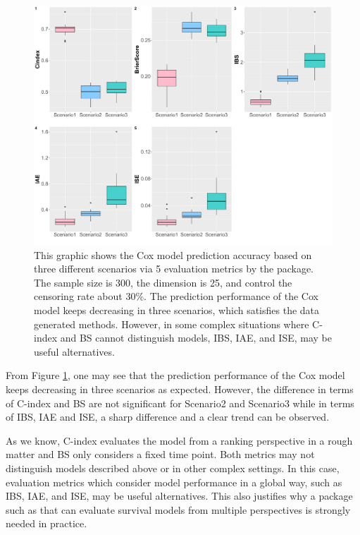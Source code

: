 \begin{figure}[h]
  \centering
  \begin{center}
  \includegraphics[width=\textwidth]{simuladataexp.pdf}
  \caption{
   This graphic shows the Cox model prediction accuracy based on three different scenarios via 5 evaluation metrics by the  package. The sample size is 300, the dimension is 25, and control the censoring rate about 30\%. The prediction performance of the Cox model keeps decreasing in three scenarios, which satisfies the data generated methods. However, in some complex situations where C-index and BS cannot distinguish models, IBS, IAE, and ISE, may be useful alternatives.}\label{fig3.1}
  \end{center}
\end{figure}


From Figure \ref{fig3.1}, one may see that the prediction performance of the Cox model keeps decreasing in three scenarios as expected. However, the difference in terms of C-index and BS are not significant for Scenario2 and Scenario3 while in terms of IBS, IAE and ISE, a sharp difference and a clear trend can be observed.

As we know, C-index evaluates the model from a ranking perspective in a rough matter and BS only considers a fixed time point. Both metrics may not distinguish models described above or in other complex settings. In this case, evaluation metrics which consider model performance in a global way, such as IBS, IAE, and ISE,  may be useful alternatives. This also justifies why a package such as  that can evaluate survival models from multiple perspectives is strongly needed in practice.


